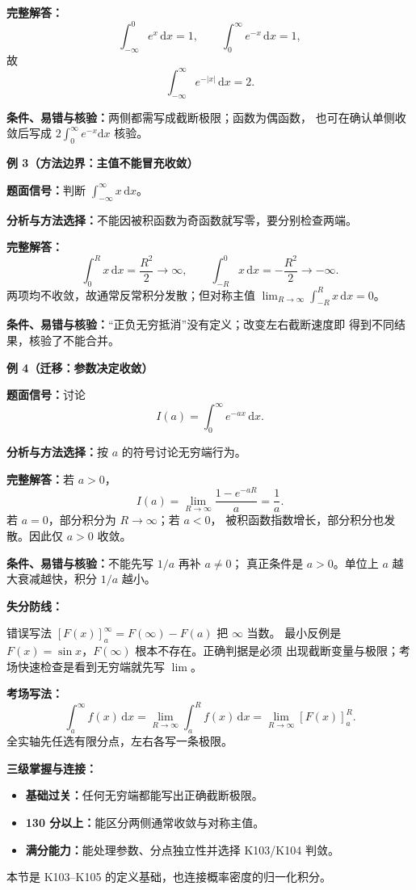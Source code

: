 \begin{knowledgeBox}
\textbf{完整解答：}
\[
\int_{-\infty}^{0}e^x\,\mathrm dx=1,\qquad
\int_0^\infty e^{-x}\,\mathrm dx=1,
\]
故
\[
\int_{-\infty}^{\infty}e^{-|x|}\,\mathrm dx=2.
\]

\textbf{条件、易错与核验：}两侧都需写成截断极限；函数为偶函数，
也可在确认单侧收敛后写成 \(2\int_0^\infty e^{-x}\mathrm dx\) 核验。

\textbf{例 3（方法边界：主值不能冒充收敛）}

\textbf{题面信号：}判断
\(\int_{-\infty}^{\infty}x\,\mathrm dx\)。

\textbf{分析与方法选择：}不能因被积函数为奇函数就写零，要分别检查两端。

\textbf{完整解答：}
\[
\int_0^R x\,\mathrm dx=\frac{R^2}{2}\to\infty,
\qquad
\int_{-R}^0x\,\mathrm dx=-\frac{R^2}{2}\to-\infty.
\]
两项均不收敛，故通常反常积分发散；但对称主值
\(\lim_{R\to\infty}\int_{-R}^Rx\,\mathrm dx=0\)。

\textbf{条件、易错与核验：}“正负无穷抵消”没有定义；改变左右截断速度即
得到不同结果，核验了不能合并。

\textbf{例 4（迁移：参数决定收敛）}

\textbf{题面信号：}讨论
\[
I(a)=\int_0^\infty e^{-ax}\,\mathrm dx.
\]

\textbf{分析与方法选择：}按 \(a\) 的符号讨论无穷端行为。

\textbf{完整解答：}若 \(a>0\)，
\[
I(a)=\lim_{R\to\infty}\frac{1-e^{-aR}}a=\frac1a.
\]
若 \(a=0\)，部分积分为 \(R\to\infty\)；若 \(a<0\)，
被积函数指数增长，部分积分也发散。因此仅 \(a>0\) 收敛。

\textbf{条件、易错与核验：}不能先写 \(1/a\) 再补 \(a\ne0\)；
真正条件是 \(a>0\)。单位上 \(a\) 越大衰减越快，积分 \(1/a\) 越小。

\textbf{失分防线：}

错误写法 \([F(x)]_a^\infty=F(\infty)-F(a)\) 把 \(\infty\) 当数。
最小反例是 \(F(x)=\sin x\)，\(F(\infty)\) 根本不存在。正确判据是必须
出现截断变量与极限；考场快速检查是看到无穷端就先写 \(\lim\)。

\textbf{考场写法：}
\[
\int_a^\infty f(x)\,\mathrm dx
=\lim_{R\to\infty}\int_a^Rf(x)\,\mathrm dx
=\lim_{R\to\infty}[F(x)]_a^R.
\]
全实轴先任选有限分点，左右各写一条极限。

\textbf{三级掌握与连接：}
\begin{itemize}
  \item \textbf{基础过关：}任何无穷端都能写出正确截断极限。
  \item \textbf{130 分以上：}能区分两侧通常收敛与对称主值。
  \item \textbf{满分能力：}能处理参数、分点独立性并选择 K103/K104 判敛。
\end{itemize}
本节是 K103--K105 的定义基础，也连接概率密度的归一化积分。
\end{knowledgeBox}

